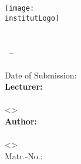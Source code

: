 
\begin{titlepage}

  \begin{center}
    \sffamily

    \texttt{[image: \\institutLogo]}\\[4ex]

    \huge{\institutName}\\[1ex]
    \LARGE{\fakultaet}\\[1ex]
    \Large{\studiengang\ --\ \studiengangKuerzel}\\[50pt]

    \huge{\textbf{\titel}}\\[1ex]
    \large{Date of Submission: \abgabeTermin}\\[50pt]

    \large
    \textbf{Lecturer:}\\
    \\
    <>\\[3ex]

    \textbf{Author:}\\
    \autorName\\
    <\autorEmail>\\
    Matr.-No.: \autorMatnr\\[50pt]

    \semester

    \rmfamily
  \end{center}

\end{titlepage}

